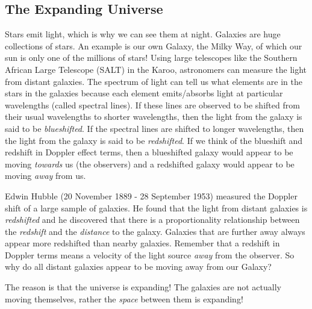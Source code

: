 \subsection{The Expanding Universe}
Stars emit light, which is why we can see them at night. Galaxies are huge collections of stars. An example is our own Galaxy, the Milky Way, of which our sun is only one of the millions of stars! Using large telescopes like the Southern African Large Telescope (SALT) in the Karoo, astronomers can measure the light from distant galaxies. The spectrum of light can tell us what elements are in the stars in the galaxies because each element emits/absorbs light at particular wavelengths (called spectral lines). If these lines are observed to be shifted from their usual wavelengths to shorter wavelengths, then the light from the galaxy is said to be \textit{blueshifted}. If the spectral lines are shifted to longer wavelengths, then the light from the galaxy is said to be \textit{redshifted}. 
If we think of the blueshift and redshift in Doppler effect terms, then a blueshifted galaxy would appear to be moving \textit{towards} us (the observers) and a redshifted galaxy would appear to be moving \textit{away} from us.



Edwin Hubble (20 November 1889 - 28 September 1953) measured the Doppler shift of a large sample of galaxies. He found that the light from distant galaxies is \textit{redshifted} and he discovered that there is a proportionality relationship between the \textit{redshift} and the \textit{distance} to the galaxy. Galaxies that are further away always appear more redshifted than nearby galaxies. Remember that a redshift in Doppler terms means a velocity of the light source \textit{away} from the observer. So why do all distant galaxies appear to be moving away from our Galaxy?

The reason is that the universe is expanding! The galaxies are not actually moving themselves, rather the \textit{space} between them is expanding!

